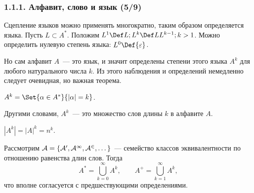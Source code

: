 \begin{frame}
\frametitle{1.1.1. Алфавит, слово и язык (5/9)}
Сцепление языков можно применять многократно,
таким образом определяется  языка. Пусть $L\subset A^*$. Положим
$L^1 \Def L; L^k\Def L L^{k-1}; k>1$. Можно 
определить нулевую степень языка:
$L^0 \Def \{\varepsilon\}$.

Но сам алфавит $A$~--- это язык,
и значит определены степени этого языка $A^k$
для любого натурального числа $k$. 
Из этого наблюдения и определений
немедленно следует очевидная, 
но важная теорема.

\begin{theorem}
$A^k=\Set{\alpha\in A^*}{|\alpha|=k}$.
\end{theorem}

\begin{remark}
Другими словами, $A^k$~--- это множество слов длины $k$ в алфавите $A$.
\end{remark}

\begin{corollary}
$|A^k|=|A|^k =n^k.$
\end{corollary} 

Рассмотрим $\cal{A} = \{ A^0, A^1, A^2, \dots\}$~--- семейство классов эквивалентности
по отношению равенства длин слов. Тогда
$$A^* = \bigcup_{k=0}^\infty A^k, \qquad
A^+ = \bigcup_{k=1}^\infty A^k,$$
что вполне согласуется с предшествующими определениями.
\end{frame}

